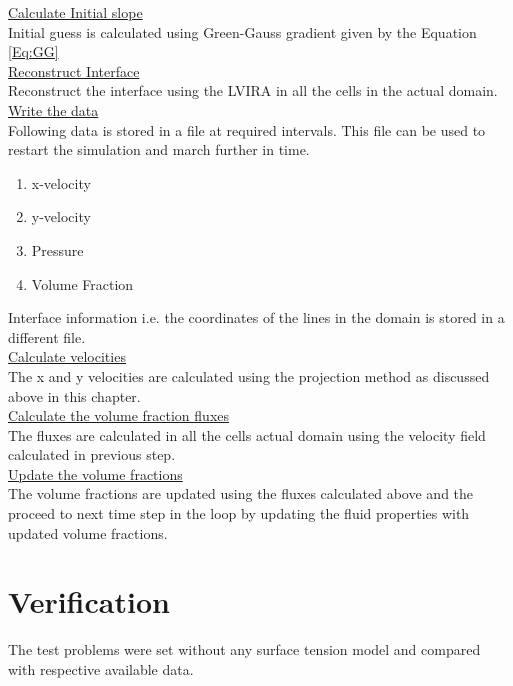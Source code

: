 \underline{Calculate Initial slope}\\
Initial guess is calculated using Green-Gauss gradient given by the Equation \ref{Eq:GG}\\
\underline{Reconstruct Interface}\\
Reconstruct the interface using the LVIRA in all the cells in the actual domain.\\
\underline{Write the data}\\
Following data is stored in a file at required intervals. This file can be used to restart the simulation and march further in time.
\begin{enumerate}
 \item x-velocity
 \item y-velocity
 \item Pressure
 \item Volume Fraction
\end{enumerate}
Interface information i.e. the coordinates of the lines in the domain is stored in a different file.\\
\underline{Calculate velocities}\\
The x and y velocities are calculated using the projection method as discussed above in this chapter.\\
\underline{Calculate the volume fraction fluxes}\\
The fluxes are calculated in all the cells actual domain using the velocity field calculated in previous step.\\
\underline{Update the volume fractions}\\
The volume fractions are updated using the fluxes calculated above and the proceed to next time step in the loop by updating the fluid properties with 
updated volume fractions.

\section{Verification}
The test problems were set without any surface tension model and compared with respective available data.
